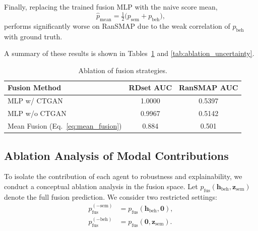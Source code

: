 \documentclass[3p]{elsarticle}
\begin{document}
Finally, replacing the trained fusion MLP with the naive score mean,
\begin{equation}
\hat{p}_{\mathrm{mean}} = \tfrac{1}{2} \bigl( p_{\mathrm{sem}} + p_{\mathrm{beh}} \bigr),
\label{eq:mean_fusion}
\end{equation}
performs significantly worse on RanSMAP due to the weak correlation of \(p_{\mathrm{beh}}\) with ground truth.

A summary of these results is shown in Tables~\ref{tab:ablation_fusion} and \ref{tab:ablation_uncertainty}.

\begin{table}[ht]
\centering
\begin{tabular}{lcc}
\toprule
\textbf{Fusion Method} & \textbf{RDset AUC} & \textbf{RanSMAP AUC} \\
\midrule
MLP w/ CTGAN & 1.0000 & 0.5397 \\
MLP w/o CTGAN & 0.9967 & 0.5142 \\
Mean Fusion (Eq.~\ref{eq:mean_fusion}) & 0.884 & 0.501 \\
\bottomrule
\end{tabular}
\caption{Ablation of fusion strategies.}
\label{tab:ablation_fusion}
\end{table}

\begin{table}[ht]
\centering
{}
\caption{Effect of removing uncertainty terms on triage performance.}
\label{tab:ablation_uncertainty}
\end{table}

\subsection{Ablation Analysis of Modal Contributions}

To isolate the contribution of each agent to robustness and explainability, we conduct a conceptual ablation analysis in the fusion space.
Let $p_{\mathrm{fus}}(\mathbf{h}_{\mathrm{beh}}, \mathbf{z}_{\mathrm{sem}})$ denote the full fusion prediction.
We consider two restricted settings:
\begin{align}
p_{\mathrm{fus}}^{(-\mathrm{sem})} &= p_{\mathrm{fus}}(\mathbf{h}_{\mathrm{beh}}, \mathbf{0}),
\label{eq:ablate_sem} \\
p_{\mathrm{fus}}^{(-\mathrm{beh})} &= p_{\mathrm{fus}}(\mathbf{0}, \mathbf{z}_{\mathrm{sem}}).
\label{eq:ablate_beh}
\end{align}
\end{document}
